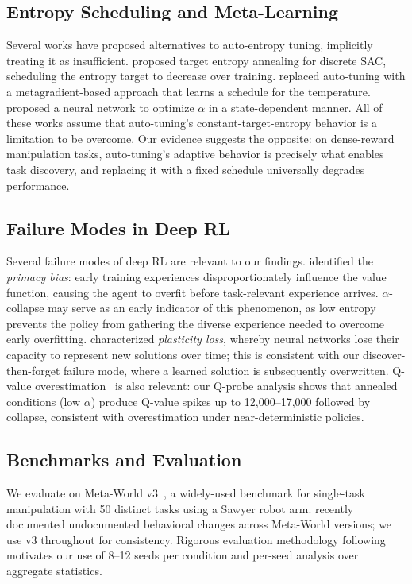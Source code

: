 \documentclass[twocolumn]{article}
\begin{document}
\subsection{Entropy Scheduling and Meta-Learning}

Several works have proposed alternatives to auto-entropy tuning, implicitly
treating it as insufficient. \citet{zhou2021} proposed target entropy annealing
for discrete SAC, scheduling the entropy target to decrease over training.
\citet{wang2020} replaced auto-tuning with a metagradient-based approach
that learns a schedule for the temperature. \citet{zhou2025} proposed a neural
network to optimize $\alpha$ in a state-dependent manner. All of these works
assume that auto-tuning's constant-target-entropy behavior is a limitation to
be overcome. Our evidence suggests the opposite: on dense-reward manipulation
tasks, auto-tuning's adaptive behavior is precisely what enables task discovery,
and replacing it with a fixed schedule universally degrades performance.

\subsection{Failure Modes in Deep RL}

Several failure modes of deep RL are relevant to our findings.
\citet{nikishin2022} identified the \emph{primacy bias}: early training
experiences disproportionately influence the value function, causing the agent
to overfit before task-relevant experience arrives. $\alpha$-collapse may serve
as an early indicator of this phenomenon, as low entropy prevents the policy
from gathering the diverse experience needed to overcome early overfitting.
\citet{lyle2023} characterized \emph{plasticity loss}, whereby neural networks
lose their capacity to represent new solutions over time; this is consistent
with our discover-then-forget failure mode, where a learned solution is
subsequently overwritten. Q-value overestimation~\citep{fujimoto2018} is
also relevant: our Q-probe analysis shows that annealed conditions (low $\alpha$)
produce Q-value spikes up to 12,000--17,000 followed by collapse, consistent
with overestimation under near-deterministic policies.

\subsection{Benchmarks and Evaluation}

We evaluate on Meta-World v3~\citep{yu2020}, a widely-used benchmark for
single-task manipulation with 50 distinct tasks using a Sawyer robot arm.
\citet{mclean2025} recently documented undocumented behavioral changes across
Meta-World versions; we use v3 throughout for consistency. Rigorous evaluation
methodology following \citet{agarwal2021} motivates our use of 8--12 seeds
per condition and per-seed analysis over aggregate statistics.
\end{document}
